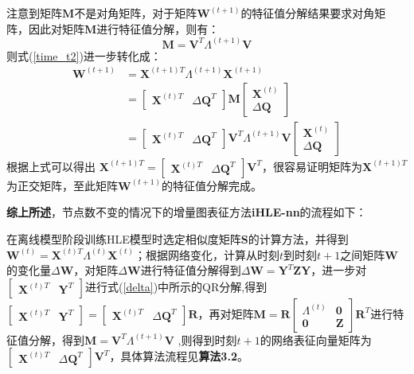 注意到矩阵$\textbf{M}$不是对角矩阵，对于矩阵$\textbf{W}^{(t+1)}$的特征值分解结果要求对角矩阵，因此对矩阵$\textbf{M}$进行特征值分解，则有：
\begin{equation}
	\textbf{M} =\textbf{V}^T \Lambda^{(t+1)} \textbf{V}
\end{equation}
则式(\ref{time_t2})进一步转化成：
\begin{equation}
\begin{aligned}
\textbf{W}^{(t+1)} &= \textbf{X}^{(t+1)T} \Lambda^{(t+1)} \textbf{X} ^{(t+1)} \\
&= \begin{bmatrix} \textbf{X}^{(t)T} & \Delta\textbf{Q}^{T} \end{bmatrix}
\textbf{M} \begin{bmatrix} \textbf{X}^{(t)} \\ \Delta\textbf{Q} \end{bmatrix} \\
&= \begin{bmatrix} \textbf{X}^{(t)T} & \Delta\textbf{Q}^{T} \end{bmatrix} \textbf{V}^T \Lambda^{(t+1)} \textbf{V}
\begin{bmatrix} \textbf{X}^{(t)} \\ \Delta\textbf{Q} \end{bmatrix}
\end{aligned}
\end{equation}
根据上式可以得出 $\textbf{X}^{(t+1)T} = \begin{bmatrix} \textbf{X}^{(t)T} & \Delta\textbf{Q}^{T} \end{bmatrix} \textbf{V}^T$，很容易证明矩阵为$\textbf{X}^{(t+1)T}$为正交矩阵，至此矩阵$\textbf{W}^{(t+1)}$的特征值分解完成。

\textbf{综上所述}，节点数不变的情况下的增量图表征方法\textbf{iHLE-nn}的流程如下：

在离线模型阶段训练HLE模型时选定相似度矩阵$\textbf{S}$的计算方法，并得到$\textbf{W}^{(t)} = \textbf{X}^{(t)T} \Lambda^{(t)} \textbf{X} ^{(t)}$；根据网络变化，计算从时刻$t$到时刻$t+1$之间矩阵$\textbf{W}$的变化量$\Delta\textbf{W}$，对矩阵$\Delta\textbf{W}$进行特征值分解得到$\Delta\textbf{W} =  \textbf{Y}^{T} \textbf{Z}  \textbf{Y}$，进一步对$\begin{bmatrix} \textbf{X}^{(t)T} & \textbf{Y}^{T}\end{bmatrix}$进行式(\ref{delta})中所示的QR分解,得到$\begin{bmatrix} \textbf{X}^{(t)T} & \textbf{Y}^{T}\end{bmatrix} = \begin{bmatrix} \textbf{X}^{(t)T} & \Delta\textbf{Q}^{T} \end{bmatrix} \textbf{R}$，再对矩阵$\textbf{M} = \textbf{R}\begin{bmatrix}  \Lambda^{(t)} & \textbf{0}\\
\textbf{0} & \textbf{Z} \end{bmatrix}
\textbf{R}^T$进行特征值分解，得到$\textbf{M} =\textbf{V}^T \Lambda^{(t+1)} \textbf{V}$
,则得到时刻$t+1$的网络表征向量矩阵为$\begin{bmatrix} \textbf{X}^{(t)T} & \Delta\textbf{Q}^{T} \end{bmatrix} \textbf{V}^T$，具体算法流程见\textbf{算法3.2}。%

